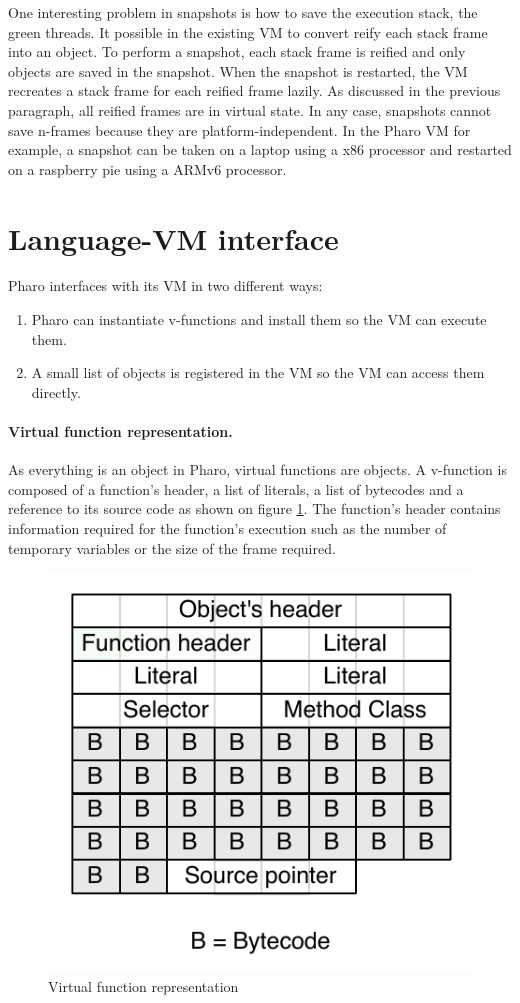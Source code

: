 \documentclass[a4paper,12pt,twoside]{../includes/ThesisStyle}
\begin{document}
One interesting problem in snapshots is how to save the execution stack, \ie the green threads. It possible in the existing VM to convert reify each stack frame into an object. To perform a snapshot, each stack frame is reified and only objects are saved in the snapshot. When the snapshot is restarted, the VM recreates a stack frame for each reified frame lazily. As discussed in the previous paragraph, all reified frames are in virtual state. In any case, snapshots cannot save n-frames because they are platform-independent. In the Pharo VM for example, a snapshot can be taken on a laptop using a x86 processor and restarted on a raspberry pie using a ARMv6 processor.


\section{Language-VM interface}

Pharo interfaces with its VM in two different ways:
\begin{enumerate}
	\item Pharo can instantiate v-functions and install them so the VM can execute them.
	\item A small list of objects is registered in the VM so the VM can access them directly.
\end{enumerate}

\paragraph{Virtual function representation.}

As everything is an object in Pharo, virtual functions are objects. A v-function is composed of a function's header, a list of literals, a list of bytecodes and a reference to its source code as shown on figure \ref{fig:CompiledCode}. The function's header contains information required for the function's execution such as the number of temporary variables or the size of the frame required.

\begin{figure}[h!]
    \begin{center}
        \includegraphics[width=0.4\linewidth]{CompiledCode}
        \caption{Virtual function representation}
        \label{fig:CompiledCode}
    \end{center}
\end{figure}
\end{document}
